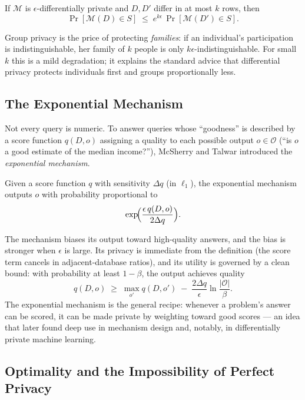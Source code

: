 \begin{theorem}
\label{thm:dp:group}
If $\mathcal{M}$ is $\epsilon$-differentially private and $D, D'$ differ in at most $k$ rows, then
\[
\Pr[\mathcal{M}(D) \in S] \;\le\; e^{k \epsilon}\, \Pr[\mathcal{M}(D') \in S].
\]
\end{theorem}

Group privacy is the price of protecting \emph{families}: if an individual's participation is indistinguishable, her family of $k$ people is only $k\epsilon$-indistinguishable. For small $k$ this is a mild degradation; it explains the standard advice that differential privacy protects individuals first and groups proportionally less.

\subsection{The Exponential Mechanism}
\label{sec:dp:exponential}

Not every query is numeric. To answer queries whose ``goodness'' is described by a score function $q(D, o)$ assigning a quality to each possible output $o \in \mathcal{O}$ (``is $o$ a good estimate of the median income?''), McSherry and Talwar introduced the \emph{exponential mechanism}.  \cite{mcsherrytalwar2007}

\begin{definition}
Given a score function $q$ with sensitivity $\Delta q$ (in $\ell_1$), the exponential mechanism outputs $o$ with probability proportional to
\[
\exp\!\Bigl(\frac{\epsilon\, q(D, o)}{2 \Delta q}\Bigr).
\]
\end{definition}

The mechanism biases its output toward high-quality answers, and the bias is stronger when $\epsilon$ is large. Its privacy is immediate from the definition (the score term cancels in adjacent-database ratios), and its utility is governed by a clean bound: with probability at least $1 - \beta$, the output achieves quality
\[
q(D, o) \;\ge\; \max_{o'} q(D, o') \;-\; \frac{2\Delta q}{\epsilon} \ln \frac{|\mathcal{O}|}{\beta}.
\]
The exponential mechanism is the general recipe: whenever a problem's answer can be scored, it can be made private by weighting toward good scores --- an idea that later found deep use in mechanism design and, notably, in differentially private machine learning. 

\subsection{Optimality and the Impossibility of Perfect Privacy}
\label{sec:dp:optimality}

